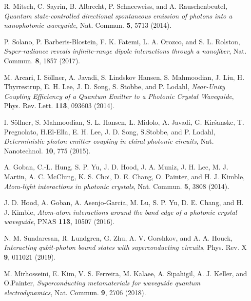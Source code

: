 \documentclass[pra,twocolumn,showpacs,preprintnumbers,amsmath,amssymb]{revtex4-1}
\begin{document}
\begin{thebibliography}{99}
 R. Mitsch,  C. Sayrin,  B. Albrecht,  P.  Schneeweiss, and A. 
Rauschenbeutel, {\it Quantum state-controlled directional spontaneous  emission  of  photons  into  a  nanophotonic waveguide}, Nat. Commun. {\bf 5}, 5713 (2014).


 P. Solano, P. Barberis-Blostein, F. K. Fatemi, L. A. Orozco, and S. L. Rolston, \textit{Super-radiance reveals infinite-range dipole interactions through a nanofiber}, Nat. Commun. {\bf 8},  1857 (2017).




 M. Arcari, I. S\"ollner, A. Javadi, S. Lindskov Hansen, S. Mahmoodian, J. Liu, H. Thyrrestrup, E. H. Lee, J. D. Song, S. Stobbe, and P. Lodahl,  \textit{Near-Unity Coupling Efficiency of a Quantum Emitter to a Photonic Crystal Waveguide},  Phys. Rev. Lett. {\bf 113}, 093603 (2014).

 I. S\"ollner, S. Mahmoodian, S. L. Hansen, L. Midolo, A. Javadi, G. Kir\v{s}anske, T. Pregnolato, H.El-Ella, E. H. Lee, J. D. Song, S.Stobbe, and P. Lodahl,
\textit{Deterministic photon-emitter coupling in chiral photonic circuits},  Nat.  Nanotechnol. {\bf 10},  775 (2015).

 A. Goban, C.-L. Hung, S. P. Yu, J. D. Hood, J. A. Muniz, J. H. Lee, M. J. Martin, A. C. McClung, K. S. Choi, D. E. Chang, O. Painter, and H. J. Kimble, \textit{Atom-light interactions in photonic crystals}, Nat. Commun. {\bf 5}, 3808 (2014).  

 J. D. Hood, A. Goban, A. Asenjo-Garcia, M. Lu, S. P. Yu, D. E. Chang, and H. J. Kimble,  \textit{Atom-atom interactions around the band edge of a photonic crystal waveguide},  PNAS {\bf 113},  10507 (2016).









 N. M. Sundaresan, R. Lundgren, G. Zhu, A. V. Gorshkov, and A. A. Houck, \textit{Interacting qubit-photon bound states with superconducting circuits}, Phys. Rev. X  {\bf 9}, 011021 (2019).

 M. Mirhosseini, E. Kim, V. S. Ferreira, M. Kalaee, A. Sipahigil, A. J. Keller, and O.Painter, \textit{Superconducting metamaterials for waveguide quantum electrodynamics},   Nat. Commun.  {\bf 9}, 2706 (2018). 


\end{thebibliography}
\end{document}
